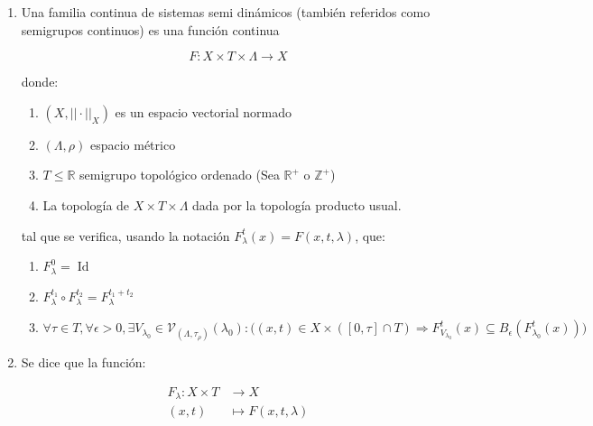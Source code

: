 \begin{defn}
	\begin{enumerate}
		\item Una familia continua de sistemas semi dinámicos (también referidos como semigrupos continuos) es una función continua
		
		\begin{equation*}
			F:X\times T\times \Lambda \to X
		\end{equation*} 
		
		donde:
		
		\begin{enumerate}
			\item $(X,||\cdot||_X)$ es un espacio vectorial normado
			
			\item $(\Lambda,\rho)$ espacio métrico
			
			\item $T\leq \mathbb{R}$ semigrupo topológico ordenado (Sea $\mathbb{R}^+$ o $\mathbb{Z}^+$)
			
			\item La topología de $X\times T\times \Lambda$ dada por la topología producto usual.
		\end{enumerate}
		
		tal que se verifica, usando la notación $F_\lambda^t(x) = F(x,t,\lambda)$, que:
		
		\begin{enumerate}
			\item $F_\lambda^0 = \operatorname{Id}$
			
			\item $F_\lambda^{t_1}\circ F_\lambda^{t_2} = F_\lambda^{t_1+ t_2}$
			
			\item \begin{equation*}
				\forall \tau \in T, \forall \epsilon>0, \exists V_{\lambda_0}\in \mathcal{V}_{(\Lambda,\tau_\rho)}(\lambda_0) : \bigg( (x,t) \in X\times ([0,\tau]\cap T)\Rightarrow F_{V_{\lambda_0}}^t(x) \subseteq B_\epsilon(F_{\lambda_0}^t(x)) \bigg)
			\end{equation*}
		\end{enumerate}
		
		\item Se dice que la función:
		
		\begin{align*}
			F_\lambda:X\times T&\to X\\
			(x,t)&\mapsto F(x,t,\lambda)
		\end{align*} 
		

\end{enumerate}
\end{defn}
